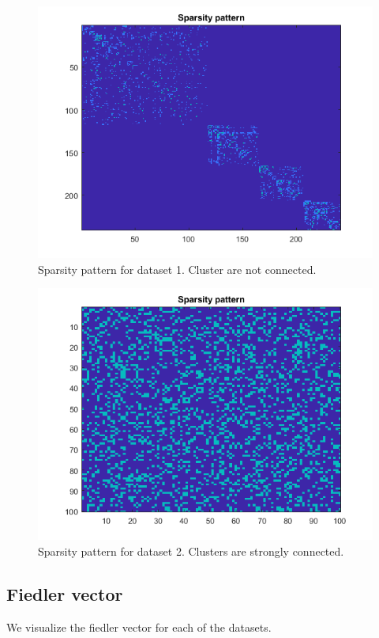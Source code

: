 \documentclass[]{article}
\begin{document}
\begin{figure}[!h]
    \centering
    \includegraphics[width=.8\textwidth]{../example1_sparsityPattern.png}
    \caption{Sparsity pattern for dataset 1. Cluster are not connected.}
    \label{fig:sp1}
\end{figure}

\begin{figure}[!h]
    \centering
    \includegraphics[width=.8\textwidth]{../example2_sparsityPattern.png}
    \caption{Sparsity pattern for dataset 2. Clusters are strongly connected.}
    \label{fig:sp2}
\end{figure}

\pagebreak

\subsection{Fiedler vector}

We visualize the fiedler vector for each of the datasets.
\end{document}

